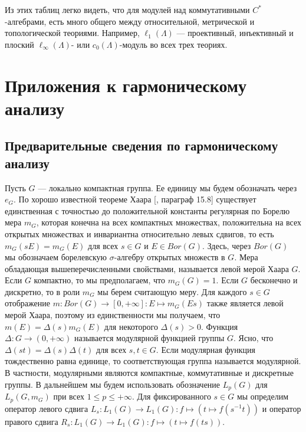 Из этих таблиц легко видеть, что для модулей над коммутативными $C^*$-алгебрами, есть много общего между относительной, метрической и топологической теориями. Например, $\ell_1(\Lambda)$ --- проективный, инъективный и плоский $\ell_\infty(\Lambda)$- или $c_0(\Lambda)$-модуль во всех трех теориях. 



\section{Приложения к гармоническому анализу}
\label{SectionApplicationsToHarmonicAnalysis}



\subsection{Предварительные сведения по гармоническому анализу}
\label{SubSectionPreliminariesOnHarmonicAnalysis}

Пусть $G$ --- локально компактная группа. Ее единицу мы будем обозначать через $e_G$. По хорошо известной теореме Хаара [\cite{HewRossAbstrHarmAnalVol1}, параграф 15.8] существует единственная с точностью до положительной константы регулярная по Борелю мера $m_G$, которая конечна на всех компактных множествах, положительна на всех открытых множествах и инвариантна относительно левых сдвигов, то есть $m_G(sE)=m_G(E)$ для всех $s\in G$ и $E\in Bor(G)$. Здесь, через $Bor(G)$ мы обозначаем борелевскую $\sigma$-алгебру открытых множеств в $G$. Мера обладающая вышеперечисленными свойствами, называется левой мерой Хаара $G$. Если $G$ компактно, то мы предполагаем, что $m_G(G)=1$. Если $G$ бесконечно и дискретно, то в роли $m_G$ мы берем считающую меру. Для каждого $s\in G$ отображение $m:Bor(G)\to[0,+\infty]:E\mapsto m_G(Es)$ также является левой мерой Хаара, поэтому из единственности мы получаем, что $m(E)=\Delta(s)m_G(E)$ для некоторого $\Delta(s)>0$. Функция $\Delta:G\to(0,+\infty)$ называется модулярной функцией группы $G$. Ясно, что $\Delta(st)=\Delta(s)\Delta(t)$ для всех $s,t\in G$. Если модулярная функция тождественно равна единице, то соответствующая группа называется модулярной. В частности, модулярными являются компактные, коммутативные и дискретные группы. В дальнейшем мы будем использовать обозначение $L_p(G)$ для $L_p(G,m_G)$ при всех $1\leq p\leq+\infty$. Для фиксированного $s\in G$ мы определим оператор левого сдвига $L_s:L_1(G)\to L_1(G):f\mapsto(t\mapsto f(s^{-1}t))$ и оператор правого сдвига $R_s:L_1(G)\to L_1(G):f\mapsto (t\mapsto f(ts))$. 

